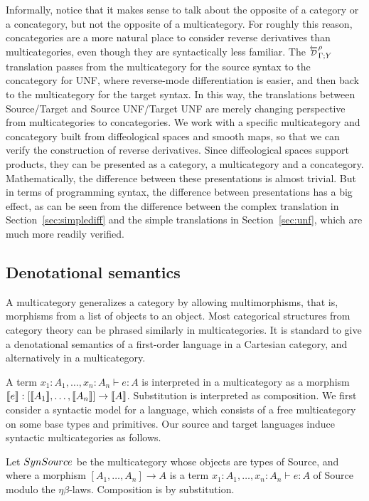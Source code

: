 Informally, notice that it makes sense to talk about the opposite of a category or a concategory, but not the opposite of a multicategory. 
For roughly this reason, concategories are a more natural place to consider reverse derivatives than multicategories, 
even though they are syntactically less familiar. 
The $\directD{\rho}{\Gamma}{Y}$ translation passes from the multicategory for the source syntax to the concategory for UNF, where reverse-mode differentiation is easier, and then back to the multicategory for the target syntax. 
In this way, the translations between Source/Target and Source UNF/Target UNF are merely changing perspective from multicategories to concategories.
We work with a specific multicategory and concategory built from diffeological spaces and smooth maps, so that we can verify the construction of reverse derivatives. 
Since diffeological spaces support products, they can be presented as a category, a multicategory and a concategory. 
Mathematically, the difference between these presentations is almost trivial. 
But in terms of programming syntax, the difference between presentations has a big effect, as can be seen from the difference between the complex translation in Section~\ref{sec:simplediff} and the simple translations in Section~\ref{sec:unf}, which are much more readily verified.

\subsection{Denotational semantics} %
\label{sub:Denotational semantics source and Target}

A multicategory generalizes a category by allowing multimorphisms, that is, morphisms from a list of objects to an object.
Most categorical structures from category theory can be phrased similarly in multicategories.
It is standard to give a denotational semantics of a first-order language in a Cartesian category, and alternatively in a multicategory.

A term $x_1:A_1,\ldots,x_n:A_n\vdash e:A$ is interpreted in a multicategory as a morphism $\llbracket e\rrbracket:[\llbracket A_1\rrbracket,\ldots,\llbracket A_n\rrbracket]\to \llbracket A\rrbracket$.
Substitution is interpreted as composition. We first consider a syntactic model for a language, which consists of a 
free multicategory on some base types and primitives. Our source and target languages induce syntactic multicategories as follows.

\begin{definition}
    Let $SynSource$ be the multicategory whose objects are types of Source, and where a morphism 
    $[A_1,\ldots,A_n]\to A$ is a term $x_1:A_1,\ldots,x_n:A_n\vdash e:A$ of Source modulo the $\eta\beta$-laws.
    Composition is by substitution.
\end{definition}

